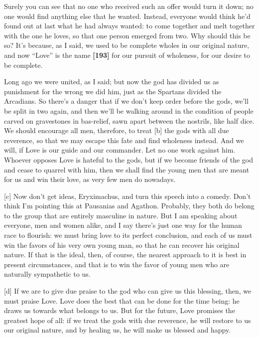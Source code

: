 Surely you can see that no one who received such an offer would turn it
down; no one would find anything else that he wanted. Instead, everyone
would think he'd found out at last what he had always wanted: to come
together and melt together with the one he loves, so that one person
emerged from two. Why should this be so? It's because, as I said, we
used to be complete wholes in our original nature, and now “Love” is the
name {\bf {[}193{]}} for our pursuit of wholeness, for our desire to be
complete.

Long ago we were united, as I said; but now the god has divided us as
punishment for the wrong we did him, just as the Spartans divided the
Arcadians. So there's
a danger that if we don't keep order before the gods, we'll be split in
two again, and then we'll be walking around in the condition of people
carved on gravestones in bas-relief, sawn apart between the nostrils,
like half dice. We should encourage all men, therefore, to treat {[}b{]}
the gods with all due reverence, so that we may escape this fate and
find wholeness instead. And we will, if Love is our guide and our
commander. Let no one work against him. Whoever opposes Love is hateful
to the gods, but if we become friends of the god and cease to quarrel
with him, then we shall find the young men that are meant for us and win
their love, as very few men do nowadays.

{[}c{]} Now don't get ideas, Eryximachus, and turn this speech into a
comedy. Don't think I'm pointing this at Pausanias and Agathon.
Probably, they both do belong to the group that are entirely masculine
in nature. But I am speaking about everyone, men and women alike, and I
say there's just one way for the human race to flourish: we must bring
love to its perfect conclusion, and each of us must win the favors of
his very own young man, so that he can recover his original nature. If
that is the ideal, then, of course, the nearest approach to it is best
in present circumstances, and that is to win the favor of young men who
are naturally sympathetic to us.

{[}d{]} If we are to give due praise to the god who can give us this
blessing, then, we must praise Love. Love does the best that can be done
for the time being: he draws us towards what belongs to us. But for the
future, Love promises the greatest hope of all: if we treat the gods
with due reverence, he will restore to us our original nature, and by
healing us, he will make us blessed and happy.

